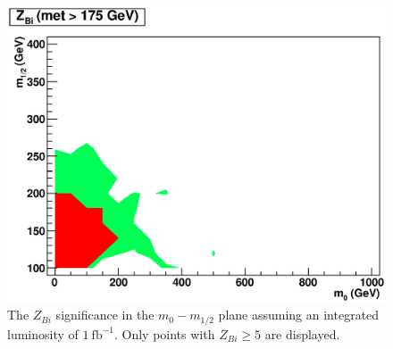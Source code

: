 \begin{figure}[htb]
\begin{center}
\includegraphics[width=0.7\linewidth]{figs/hzbi175_1fb.eps}
\caption{The  $Z_{Bi}$  significance   in  the  $m_{0}-m_{1/2}$  plane
assuming an integrated luminosity of $1~\mathrm{fb}^{-1}$. Only points
with $Z_{Bi}\geq5$ are displayed. \label{fig:zbi1fb}}
\end{center}
\end{figure}

